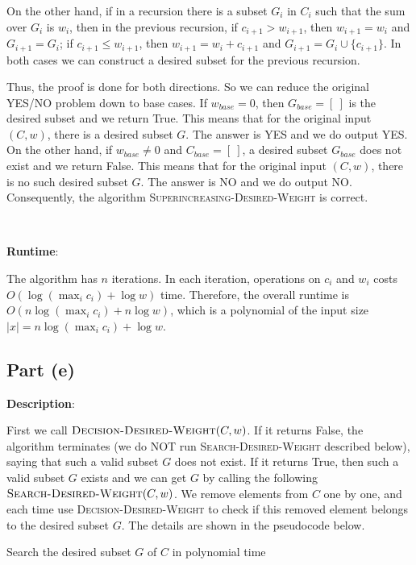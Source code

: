 \documentclass{article}
\begin{document}
On the other hand, if in a recursion there is a subset $G_i$ in $C_i$ such that the sum over $G_i$ is $w_i$, then in the previous recursion, if $c_{i+1}>w_{i+1}$, then $w_{i+1}=w_i$ and $G_{i+1}=G_i$; if $c_{i+1}\leqslant w_{i+1}$, then $w_{i+1}=w_i+c_{i+1}$ and $G_{i+1}=G_i\cup\{c_{i+1}\}$. In both cases we can construct a desired subset for the previous recursion.

Thus, the proof is done for both directions. So we can reduce the original YES/NO problem down to base cases. If $w_{base}=0$, then $G_{base}=[~]$ is the desired subset and we return True. This means that for the original input $(C,w)$, there is a desired subset $G$. The answer is YES and we do output YES. On the other hand, if $w_{base}\neq0$ and $C_{base}=[~]$, a desired subset $G_{base}$ does not exist and we return False. This means that for the original input $(C,w)$, there is no such desired subset $G$. The answer is NO and we do output NO. Consequently, the algorithm \textsc{Superincreasing-Desired-Weight} is correct.

~

\noindent\textbf{Runtime}:

The algorithm has $n$ iterations. In each iteration, operations on $c_i$ and $w_i$ costs $O(\log(\max_ic_i)+\log w)$ time. Therefore, the overall runtime is $O(n\log(\max_ic_i)+n\log w)$, which is a polynomial of the input size $|x|=n\log(\max_ic_i)+\log w$.

\subsection{Part (e)}
\noindent\textbf{Description}:

First we call $\textsc{Decision-Desired-Weight}(C,w)$. If it returns False, the algorithm terminates (we do NOT run \textsc{Search-Desired-Weight} described below), saying that such a valid subset $G$ does not exist. If it returns True, then such a valid subset $G$ exists and we can get $G$ by calling the following $\textsc{Search-Desired-Weight}(C,w)$. We remove elements from $C$ one by one, and each time use \textsc{Decision-Desired-Weight} to check if this removed element belongs to the desired subset $G$. The details are shown in the pseudocode below.
\begin{algorithm}
\caption{Search the desired subset $G$ of $C$ in polynomial time}
\begin{algorithmic}[1]
\State{}
	\Else{}
	\EndIf
\EndIf
\State{}
\EndProcedure
\end{algorithmic}
\end{algorithm}
\end{document}
